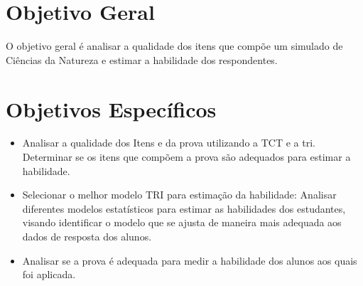 \section{Objetivo Geral}

O objetivo geral é analisar a qualidade dos itens que compõe um simulado de Ciências da Natureza e estimar a habilidade dos respondentes.

\section{Objetivos Específicos}

\begin{itemize}
	
\item Analisar a qualidade dos Itens e da prova utilizando a TCT e a tri. Determinar se os itens que compõem a prova são adequados para estimar a habilidade.	
	
\item Selecionar o melhor modelo TRI para estimação da habilidade: Analisar diferentes modelos estatísticos para estimar as habilidades dos estudantes, visando identificar o modelo que se ajusta de maneira mais adequada aos dados de resposta dos alunos. 

\item Analisar se a prova é adequada para medir a habilidade dos alunos aos quais foi aplicada.

\begin{comment}
\item Estimar os Parâmetros TRI dos Itens: Investigar os parâmetros de dificuldade, discriminação e chute (acerto casual) das questões presentes na prova, visando compreender suas características de medida e avaliar sua qualidade na avaliação da habilidade dos estudantes. Essa análise permite determinar se algumas questões devem ser descartadas devido à sua baixa qualidade ou se podem compor um banco de itens para avaliações futuras. 


\item Avaliar : Verificar se a prova é unidimensional, ou seja, se está avaliando apenas uma variável latente, assegurando que os itens sejam coesos e estejam medindo a mesma habilidade subjacente. Caso não esteja avaliando a mesma dimensão, avaliar qual a dimensionalidade do teste.
\item Avaliar a Abrangência na faixa da habilidade: Verificar em qual faixa de habilidade o teste se encontra e identificar quais níveis de habilidade precisam de maior representação por meio da inclusão de mais questões.



\item Identificar e definir itens âncoras na prova. Estabelecer escalas interpretáveis de habilidades dos estudantes com base nos itens âncoras, bem como determinar quais questões se enquadram em cada escala.
\end{comment}



\end{itemize}



